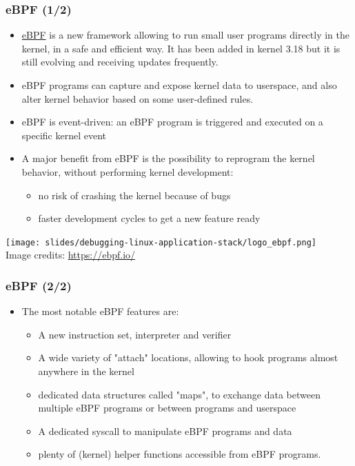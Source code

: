 \begin{frame}
  \frametitle{eBPF (1/2)}
  \begin{itemize}
    \item \href{https://ebpf.io/}{eBPF} is a new framework allowing to run
    small user programs directly in the kernel, in a safe and efficient way. It
    has been added in kernel 3.18 but it is still evolving and receiving
    updates frequently.
    \item eBPF programs can capture and expose kernel data to userspace, and
    also alter kernel behavior based on some user-defined rules.
    \item eBPF is event-driven: an eBPF program is triggered and executed on a
    specific kernel event
    \item A major benefit from eBPF is the possibility to reprogram the kernel
    behavior, without performing kernel development:
    \begin{itemize}
      \item no risk of crashing the kernel because of bugs
      \item faster development cycles to get a new feature ready
    \end{itemize}
  \end{itemize}
  \center\texttt{[image: slides/debugging-linux-application-stack/logo\_ebpf.png]}\\
  \tiny Image credits: \url{https://ebpf.io/}
\end{frame}

\begin{frame}
  \frametitle{eBPF (2/2)}
  \begin{itemize}
    \item The most notable eBPF features are:
    \begin{itemize}
      \item A new instruction set, interpreter and verifier
      \item A wide variety of "attach" locations, allowing to hook programs
      almost anywhere in the kernel
      \item dedicated data structures called "maps", to exchange data between
      multiple eBPF programs or between programs and userspace
      \item A dedicated  syscall to manipulate eBPF programs and data
      \item plenty of (kernel) helper functions accessible from eBPF programs.
    \end{itemize}
  \end{itemize}
\end{frame}

